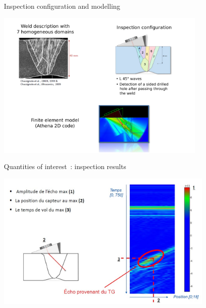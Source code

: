 \documentclass[9pt]{beamer}
\begin{document}
    \begin{frame}{Inspection configuration and modelling}
    
    \begin{center}
        \includegraphics[width=10.4cm]{../Pics/config_controle.pdf}
    \end{center}
    
    \end{frame}
    
    \begin{frame}{Quantities of interest~: inspection results}
    
    \begin{center}
        \includegraphics[width=10.8cm]{../Pics/schema_output.jpg}
    \end{center}
    
    \end{frame}
    
\end{document}
